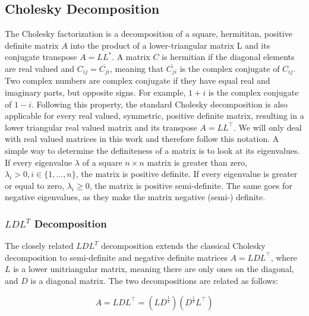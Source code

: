 \subsection{Cholesky Decomposition}

The Cholesky factorization is a decomposition of a square, hermititan,
positive definite matrix $A$ into the product of a lower-triangular
matrix L and its conjugate transpose $A = L L^*$. A matrix $C$ is
hermitian if the diagonal elements are real valued and $C_{ij} =
\overline{C_{ji}}$, meaning that $\overline{C_{ji}}$ is the complex
conjugate of $C_{ij}$. Two complex numbers are complex conjugate if they
have equal real and imaginary parts, but opposite signs. For example,
$1+i$ is the complex conjugate of $1-i$. Following this property, the
standard Cholesky decomposition is also applicable for every real
valued, symmetric, positive definite matrix, resulting in a lower
triangular real valued matrix and its transpose $A = L L^\top$. We
will only deal with real valued matrices in this work and therefore
follow this notation. A simple way to determine the definiteness of a
matrix is to look at its eigenvalues. If every eigenvalue $\lambda$ of a
square $n \times n$ matrix is greater than zero, $\lambda_{i} > 0, i \in
\{1,\dots,n\}$, the matrix is positive definite. If every eigenvalue is
greater or equal to zero, $\lambda_{i} \ge 0$, the matrix is positive
semi-definite. The same goes for negative eigenvalues, as they make the
matrix negative (semi-) definite.

\subsubsection{$LDL^T$ Decomposition}

The closely related $LDL^T$ decomposition extends the classical Cholesky
decomposition to semi-definite and negative definite matrices $A = L D
L^\top$, where $L$ is a lower unitriangular matrix, meaning there are
only ones on the diagonal, and $D$ is a diagonal matrix. The two
decompositions are related as follows:

\begin{equation}
  A = LDL^\top = (L D^\frac{1}{2}) (D^\frac{1}{2}  L^\top)
\end{equation}

